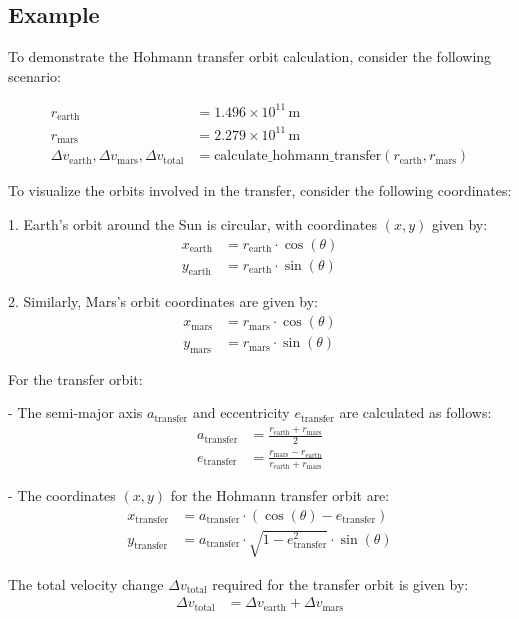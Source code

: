 \subsection{Example}

To demonstrate the Hohmann transfer orbit calculation, consider the following scenario:

\begin{align*}
    r_{\text{earth}} &= 1.496 \times 10^{11} \, \text{m} \\
    r_{\text{mars}} &= 2.279 \times 10^{11} \, \text{m} \\
    \Delta v_{\text{earth}}, \Delta v_{\text{mars}}, \Delta v_{\text{total}} &= \text{calculate\_hohmann\_transfer}(r_{\text{earth}}, r_{\text{mars}})
\end{align*}

To visualize the orbits involved in the transfer, consider the following coordinates:

1. Earth's orbit around the Sun is circular, with coordinates \((x, y)\) given by:
   \begin{align*}
       x_{\text{earth}} &= r_{\text{earth}} \cdot \cos(\theta) \\
       y_{\text{earth}} &= r_{\text{earth}} \cdot \sin(\theta)
   \end{align*}

2. Similarly, Mars's orbit coordinates are given by:
   \begin{align*}
       x_{\text{mars}} &= r_{\text{mars}} \cdot \cos(\theta) \\
       y_{\text{mars}} &= r_{\text{mars}} \cdot \sin(\theta)
   \end{align*}

For the transfer orbit:

- The semi-major axis \(a_{\text{transfer}}\) and eccentricity \(e_{\text{transfer}}\) are calculated as follows:
  \begin{align*}
      a_{\text{transfer}} &= \frac{r_{\text{earth}} + r_{\text{mars}}}{2} \\
      e_{\text{transfer}} &= \frac{r_{\text{mars}} - r_{\text{earth}}}{r_{\text{earth}} + r_{\text{mars}}}
  \end{align*}

- The coordinates \((x, y)\) for the Hohmann transfer orbit are:
  \begin{align*}
      x_{\text{transfer}} &= a_{\text{transfer}} \cdot (\cos(\theta) - e_{\text{transfer}}) \\
      y_{\text{transfer}} &= a_{\text{transfer}} \cdot \sqrt{1 - e_{\text{transfer}}^2} \cdot \sin(\theta)
  \end{align*}

The total velocity change \(\Delta v_{\text{total}}\) required for the transfer orbit is given by:
\begin{align*}
    \Delta v_{\text{total}} &= \Delta v_{\text{earth}} + \Delta v_{\text{mars}}
\end{align*}